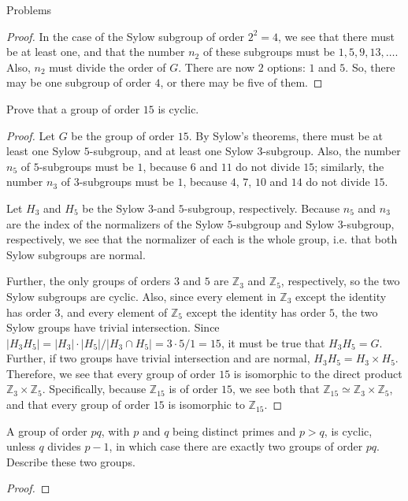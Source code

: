 \documentclass[12pt]{article}
\newcommand{\Z}{\mathbb{Z}}
\theoremstyle{definition}
\newenvironment{problem}[2][Problem]{\begin{trivlist}
\item[\hskip \labelsep {\bfseries #1}\hskip \labelsep {\bfseries #2.}]}{\end{trivlist}}
\begin{document}
\begin{section}{Problems}
\begin{problem}{3}
\begin{proof}
		\par In the case of the Sylow subgroup of order $2^2 = 4$, we see that there must be at least one, and that the number $n_2$ of these subgroups must be $1, 5, 9, 13, \dots$. Also, $n_2$ must divide the order of $G$. There are now $2$ options: $1$ and $5$. So, there may be one subgroup of order $4$, or there may be five of them.
	\end{proof}
\end{problem}
\begin{problem}{4}
	Prove that a group of order $15$ is cyclic.
	\begin{proof}
	    Let $G$ be the group of order $15$. By Sylow's theorems, there must be at least one Sylow $5$-subgroup, and at least one Sylow $3$-subgroup. Also, the number $n_5$ of $5$-subgroups must be $1$, because $6$ and $11$ do not divide $15$; similarly, the number $n_3$ of $3$-subgroups must be $1$, because $4$, $7$, $10$ and $14$ do not divide $15$.
	    \par Let $H_3$ and $H_5$ be the Sylow $3$-and $5$-subgroup, respectively. Because $n_5$ and $n_3$ are the index of the normalizers of the Sylow $5$-subgroup and Sylow $3$-subgroup, respectively, we see that the normalizer of each is the whole group, i.e. that both Sylow subgroups are normal. 
	    \par Further, the only groups of orders $3$ and $5$ are $\Z_3$ and $\Z_5$, respectively, so the two Sylow subgroups are cyclic. Also, since every element in $\Z_3$ except the identity has order $3$, and every element of $\Z_5$ except the identity has order $5$, the two Sylow groups have trivial intersection. Since $\lvert H_3H_5 \rvert = \lvert H_3 \rvert \cdot \lvert H_5 \rvert / \lvert H_3 \cap H_5 \rvert = 3 \cdot 5 / 1= 15$, it must be true that $H_3H_5 = G$. Further, if two groups have trivial intersection and are normal, $H_3H_5 = H_3 \times H_5$. Therefore, we see that every group of order $15$ is isomorphic to the direct product $\Z_3 \times \Z_5$. Specifically, because $\Z_{15}$ is of order $15$, we see both that $\Z_{15} \simeq \Z_3 \times \Z_5$, and that every group of order $15$ is isomorphic to $\Z_{15}$.
	\end{proof}
\end{problem}
\begin{problem}{5}
	A group of order $pq$, with $p$ and $q$ being distinct primes and $p > q$, is cyclic, unless $q$ divides $p - 1$, in which case there are exactly two groups of order $pq$. Describe these two groups.
	\begin{proof}

\end{proof}
\end{problem}
\end{section}
\end{document}
